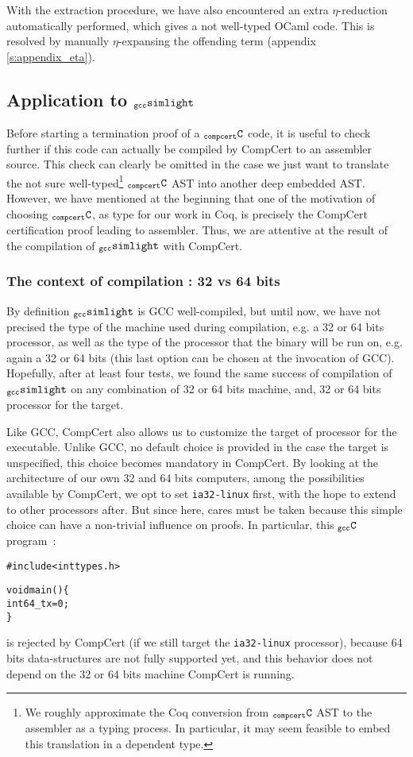 \documentclass[a4paper, 11pt]{article}
\newenvironment{humC}
  {%
   \begin{alltt}
   \footnotesize}
  {\end{alltt} %
  }
\newcommand{\gccSL}{$_{\tt gcc}{\tt simlight}$\xspace}
\newcommand{\C}{$_{\tt compcert}{\tt C}$\xspace}
\newcommand{\gccC}{$_{\tt gcc}{\tt C}$\xspace}
\begin{document}
With the extraction procedure, we have also encountered an extra $\eta$-reduction automatically performed, which gives a not well-typed OCaml code. This is resolved by manually $\eta$-expansing the offending term (appendix \ref{s:appendix_eta}).

\subsection{Application to \gccSL}
Before starting a termination proof of a \C code, it is useful to check further if this code can actually be compiled by CompCert to an assembler source. This check can clearly be omitted in the case we just want to translate the not sure well-typed\footnote{We roughly approximate the Coq conversion from \C AST to the assembler as a typing process. In particular, it may seem feasible to embed this translation in a dependent type.} \C AST into another deep embedded AST.
However, we have mentioned at the beginning that one of the motivation of choosing \C, as type for our work in Coq, is precisely the CompCert certification proof leading to assembler. Thus, we are attentive at the result of the compilation of \gccSL with CompCert.
\subsubsection{The context of compilation : 32 vs 64 bits}
By definition \gccSL is GCC well-compiled, but until now, we have not precised the type of the machine used during compilation, e.g. a 32 or 64 bits processor, as well as the type of the processor that the binary will be run on, e.g. again a 32 or 64 bits (this last option can be chosen at the invocation of GCC). Hopefully, after at least four tests, we found the same success of compilation of \gccSL on any combination of 32 or 64 bits machine, and, 32 or 64 bits processor for the target.

Like GCC, CompCert also allows us to customize the target of processor for the executable. Unlike GCC, no default choice is provided in the case the target is unspecified, this choice becomes mandatory in CompCert. By looking at the architecture of our own 32 and 64 bits computers, among the possibilities available by CompCert, we opt to set \verb|ia32-linux| first, with the hope to extend to other processors after. But since here, cares must be taken because this simple choice can have a non-trivial influence on proofs. In particular, this \gccC program~:
\begin{humC}
#include <inttypes.h>

void main() \{
  int64_t x = 0;
\}
\end{humC}
is rejected by CompCert (if we still target the \verb|ia32-linux| processor), because 64 bits data-structures are not fully supported yet, and this behavior does not depend on the 32 or 64 bits machine CompCert is running.
\end{document}
